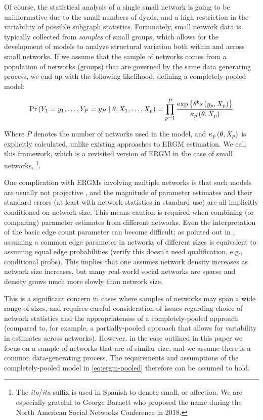 \documentclass[12pt]{article}
\begin{document}
Of course, the statistical analysis of a single small network is going to be uninformative due to the small numbers of dyads, and a high restriction in the variability of possible subgraph statistics. Fortunately, small network data is typically collected from \textit{samples} of small groups, which allows for the development of models to analyze structural variation both within and across small networks. If we assume that the sample of networks comes from a population of networks (groups) that are governed by the same data generating process, we end up with the following likelihood, defining a completely-pooled model:

\begin{equation}
    \label{eq:ergm-pooled}
    \Prcond{\Adjmat_1 = \adjmat_1, \dots, \Adjmat_P = \adjmat_P}{\params, \Indepvar_1, \dots, \Indepvar_p} = \prod_{p=1}^P\frac{%
    		\exp{\transpose{\params}\sufstats{\adjmat_p, \Indepvar_p}}%
    	}{
    		\kappa_p\left(\params, \Indepvar_p\right)
    	}
\end{equation}

\noindent Where $P$ denotes the number of networks used in the model, and $\kappa_p\left(\theta, X_p\right)$ is explicitly calculated, unlike existing approaches to ERGM estimation. We call this framework, which is a revisited version of ERGM in the case of small networks, \ergmito{}\footnote{The \textit{ito}/\textit{ita} suffix is used in Spanish to denote small, or affection. We are especially grateful to George Barnett who proposed the name during the North American Social Networks Conference in 2018.}.

One complication with ERGMs involving multiple networks is that such models are usually not projective \cite{shalizi2013}, and the magnitude of parameter estimates and their standard errors (at least with network statistics in standard use) are all implicitly conditioned on network size. This means caution is required when combining (or comparing) parameter estimates from different networks. Even the interpretation of the basic edge count parameter can become difficult; as pointed out in \cite{Krivitsky2011}, assuming a common edge parameter in networks of different sizes is equivalent to assuming equal edge probabilities (verify this doesn't need qualification, e.g., conditional probs). This implies that one assumes network density increases as network size increases, but many real-world social networks are sparse and density grows much more slowly than network size. 

This is a significant concern in cases where samples of networks may span a wide range of sizes, and requires careful consideration of issues regarding choice of network statistics and the appropriateness of a completely-pooled approach (compared to, for example, a partially-pooled approach that allows for variability in estimates across networks). However, in the case outlined in this paper we focus on a sample of networks that are of similar size, and we assume there is a common data-generating process. The requirements and assumptions of the completely-pooled model in \eqref{eq:ergm-pooled} therefore can be assumed to hold. 
\end{document}
